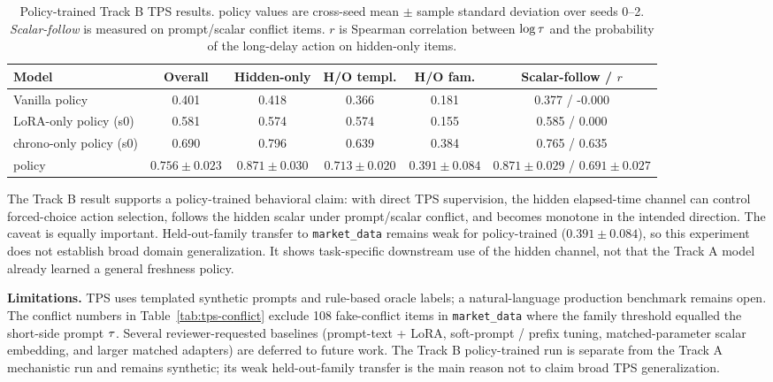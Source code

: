 \begin{table}[t]
\centering
\caption{Policy-trained Track B TPS results. \CI{} policy values are cross-seed mean $\pm$ sample standard deviation over seeds 0--2. \emph{Scalar-follow} is measured on prompt/scalar conflict items. $r$ is Spearman correlation between $\log\tau$ and the probability of the long-delay action on hidden-only items.}
\label{tab:tps-track-b}
\footnotesize
\begin{tabular}{lccccc}
\toprule
Model & Overall & Hidden-only & H/O templ. & H/O fam. & Scalar-follow / $r$ \\
\midrule
Vanilla policy & 0.401 & 0.418 & 0.366 & 0.181 & 0.377 / -0.000 \\
LoRA-only policy (s0) & 0.581 & 0.574 & 0.574 & 0.155 & 0.585 / 0.000 \\
chrono-only policy (s0) & 0.690 & 0.796 & 0.639 & 0.384 & 0.765 / 0.635 \\
\CI{} policy & $0.756\pm0.023$ & $0.871\pm0.030$ & $0.713\pm0.020$ & $0.391\pm0.084$ & $0.871\pm0.029$ / $0.691\pm0.027$ \\
\bottomrule
\end{tabular}
\end{table}

The Track B result supports a policy-trained behavioral claim: with direct TPS supervision, the hidden elapsed-time channel can control forced-choice action selection, follows the hidden scalar under prompt/scalar conflict, and becomes monotone in the intended direction. The caveat is equally important. Held-out-family transfer to \texttt{market\_data} remains weak for policy-trained \CI{} ($0.391\pm0.084$), so this experiment does not establish broad domain generalization. It shows task-specific downstream use of the hidden channel, not that the Track A model already learned a general freshness policy.

\textbf{Limitations.} TPS uses templated synthetic prompts and rule-based oracle labels; a natural-language production benchmark remains open. The conflict numbers in Table~\ref{tab:tps-conflict} exclude 108 fake-conflict items in \texttt{market\_data} where the family threshold equalled the short-side prompt $\tau$. Several reviewer-requested baselines (prompt-text + LoRA, soft-prompt / prefix tuning, matched-parameter scalar embedding, and larger matched adapters) are deferred to future work. The Track B policy-trained run is separate from the Track A mechanistic run and remains synthetic; its weak held-out-family transfer is the main reason not to claim broad TPS generalization.
